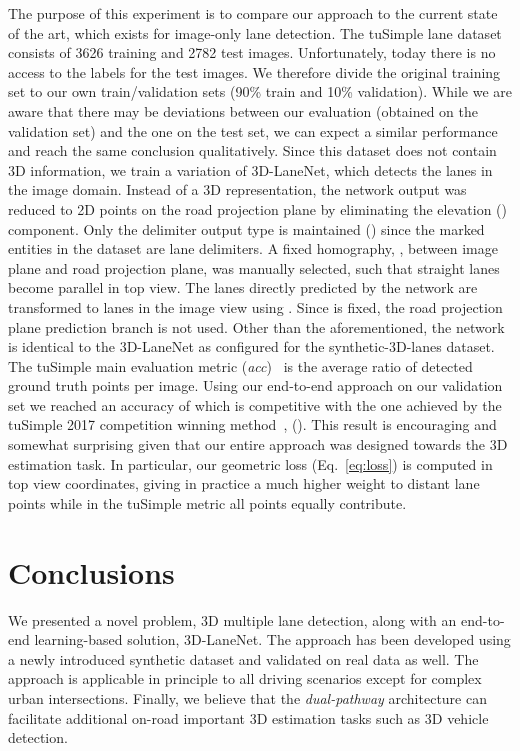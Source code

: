 \documentclass[10pt,twocolumn,letterpaper]{article}
\begin{document}
The purpose of this experiment is to compare our approach to the current state of the art, which exists for image-only lane detection. The tuSimple lane dataset~\cite{tu_simple} consists of 3626 training and 2782 test images. Unfortunately, today there is no access to the labels for the test images. We therefore divide the original training set to our own train/validation sets (90\% train and 10\% validation). While we are aware that there may be deviations between our evaluation (obtained on the validation set) and the one on the test set, we can expect a similar performance and reach the same conclusion qualitatively. Since this dataset does not contain 3D information, we train a variation of 3D-LaneNet, which detects the lanes in the image domain. Instead of a 3D representation, the network output was reduced to 2D points on the road projection plane by eliminating the elevation () component. Only the delimiter output type is maintained () since the marked entities in the dataset are lane delimiters. A fixed homography, , between image plane and road projection plane, was manually selected, such that straight lanes become parallel in top view. The lanes directly predicted by the network are transformed to lanes in the image view using . Since  is fixed, the road projection plane prediction branch is not used. Other than the aforementioned, the network is identical to the 3D-LaneNet as configured for the synthetic-3D-lanes dataset. The tuSimple main evaluation metric (\textit{acc})~\cite{tu_simple} is the average ratio of detected ground truth points per image. Using our end-to-end approach on our validation set we reached an accuracy of  which is competitive with the one achieved by the tuSimple 2017 competition winning method~\cite{SCNN}, (). This result is encouraging and somewhat surprising given that our entire approach was designed towards the 3D estimation task. In particular, our geometric loss (Eq.~\ref{eq:loss}) is computed in top view coordinates, giving in practice a much higher weight to distant lane points while in the tuSimple  metric all points equally contribute.





\section{Conclusions}
We presented a novel problem, 3D multiple lane detection, along with an end-to-end learning-based solution, 3D-LaneNet. The approach has been developed using a newly introduced synthetic dataset and validated on real data as well. The approach is applicable in principle to all driving scenarios except for complex urban intersections. Finally, we believe that the \textit{dual-pathway} architecture can facilitate additional on-road important 3D estimation tasks such as 3D vehicle detection.
{
	\small
	
	
}
\end{document}
